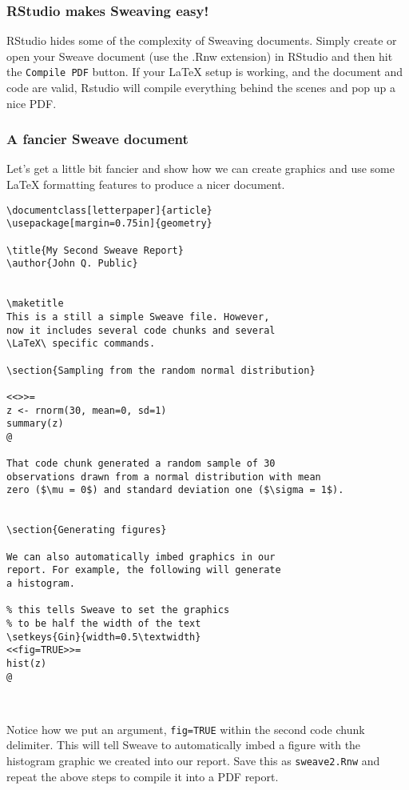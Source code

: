 \subsubsection{RStudio makes Sweaving easy!}

RStudio hides some of the complexity of Sweaving documents. Simply
create or open your Sweave document (use the .Rnw extension) in RStudio
and then hit the \lstinline!Compile PDF! button. If your LaTeX setup is
working, and the document and code are valid, Rstudio will compile
everything behind the scenes and pop up a nice PDF.

\subsubsection{A fancier Sweave document}

Let's get a little bit fancier and show how we can create graphics and
use some LaTeX formatting features to produce a nicer document.

\begin{lstlisting}
\documentclass[letterpaper]{article}
\usepackage[margin=0.75in]{geometry}

\title{My Second Sweave Report}
\author{John Q. Public}


\maketitle
This is a still a simple Sweave file. However, 
now it includes several code chunks and several 
\LaTeX\ specific commands.

\section{Sampling from the random normal distribution}

<<>>=
z <- rnorm(30, mean=0, sd=1)
summary(z)
@

That code chunk generated a random sample of 30 
observations drawn from a normal distribution with mean 
zero ($\mu = 0$) and standard deviation one ($\sigma = 1$).


\section{Generating figures}

We can also automatically imbed graphics in our 
report. For example, the following will generate 
a histogram.

% this tells Sweave to set the graphics 
% to be half the width of the text
\setkeys{Gin}{width=0.5\textwidth} 
<<fig=TRUE>>=
hist(z)
@

    
\end{lstlisting}
Notice how we put an argument, \lstinline!fig=TRUE! within the second
code chunk delimiter. This will tell Sweave to automatically imbed a
figure with the histogram graphic we created into our report. Save this
as \lstinline!sweave2.Rnw! and repeat the above steps to compile it into
a PDF report.

